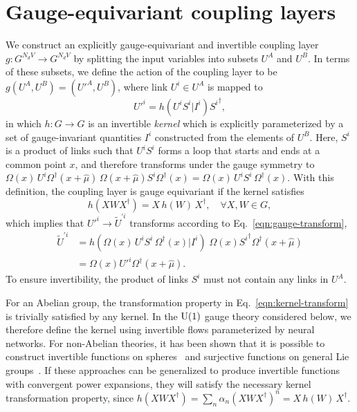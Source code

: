 \section{Gauge-equivariant coupling layers}
We construct an explicitly gauge-equivariant and invertible coupling layer $g: G^{N_d V} \rightarrow G^{N_d V}$ by splitting the input variables into subsets $U^A$ and $U^B$. In terms of these subsets, we define the action of the coupling layer to be ${g(U^A, U^B) = ({U'}^A, U^B)}$, where link $U^i \in U^A$ is mapped to
%
\begin{equation} \label{eqn:gauge-equiv-coupling}
{U'}^i = h(U^i S^i | I^i) {S^i}^{\dagger},
\end{equation}
%
in which $h: G \rightarrow G$ is an invertible \emph{kernel} which is explicitly parameterized by a set of gauge-invariant quantities $I^i$ constructed from the elements of $U^B$. Here, $S^i$ is a product of links such that $U^i S^i$ forms a loop that starts and ends at a common point $x$, and therefore transforms under the gauge symmetry to $\Omega(x) \, U^i \Omega^\dagger(x+\hat{\mu}) \, \Omega(x+\hat{\mu}) S^i \Omega^\dagger(x) = \Omega(x) \, U^i S^i \, \Omega^\dagger(x)$. With this definition, the coupling layer is gauge equivariant if the kernel satisfies
%
\begin{equation} \label{eqn:kernel-transform}
    h(X W X^\dagger) = X \, h(W) \, X^\dagger, \quad \forall X, W \in G,
\end{equation}
%
which implies that ${U'}^i \rightarrow {\widetilde{U}}^{\prime i}$ transforms according to Eq.~\eqref{eqn:gauge-transform},
\begin{equation}
\begin{aligned}
    {\widetilde{U}}^{\prime i} &= h\left( \Omega(x) \, U^i S^i \, \Omega^\dagger(x) | I^i \right) \; \Omega(x) {S^i}^\dagger \Omega^\dagger(x+\hat{\mu}) \\
    &= \Omega(x) {U'}^i \Omega^\dagger(x+\hat{\mu}).
\end{aligned}
\end{equation}
To ensure invertibility, the product of links $S^i$ must not contain any links in $U^A$.

For an Abelian group, the transformation property in Eq.~\eqref{eqn:kernel-transform} is trivially satisfied by any kernel. In the $\mathrm{U}(1)$ gauge theory considered below, we therefore define the kernel using invertible flows parameterized by neural networks. For non-Abelian theories, it has been shown that it is possible to construct invertible functions on spheres~\cite{rezende2020normalizing} and surjective functions on general Lie groups~\cite{falorsi19lie}. If these approaches can be generalized to produce invertible functions with convergent power expansions, they will satisfy the necessary kernel transformation property, since ${h(X W X^\dagger) = \sum_n \alpha_n (X W X^\dagger)^n = X \, h(W) \, X^\dagger}$.

